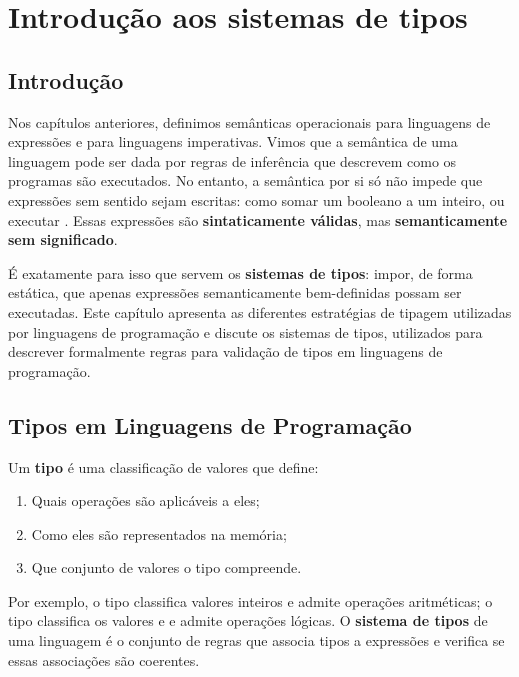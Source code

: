 \chapter{Introdução aos sistemas de tipos}

\section{Introdução}

Nos capítulos anteriores, definimos semânticas operacionais para
linguagens de expressões e para linguagens imperativas. Vimos que a
semântica de uma linguagem pode ser dada por regras de inferência que
descrevem como os programas são executados. No entanto, a semântica
por si só não impede que expressões sem sentido sejam escritas: como
somar um booleano a um inteiro, ou executar
. Essas expressões são
\textbf{sintaticamente válidas}, mas \textbf{semanticamente sem significado}.

É exatamente para isso que servem os \textbf{sistemas de tipos}:
impor, de forma estática, que apenas expressões semanticamente
bem-definidas possam ser executadas. Este capítulo apresenta as
diferentes estratégias de tipagem utilizadas por linguagens de
programação e discute os sistemas de tipos, utilizados para descrever
formalmente regras para validação de tipos em linguagens de programação.

\section{Tipos em Linguagens de Programação}

Um \textbf{tipo} é uma classificação de valores que define:

\begin{enumerate}
  \item Quais operações são aplicáveis a eles;
  \item Como eles são representados na memória;
  \item Que conjunto de valores o tipo compreende.
\end{enumerate}

Por exemplo, o tipo  classifica valores
inteiros e admite operações aritméticas; o tipo
 classifica os valores
 e  e
admite operações lógicas. O \textbf{sistema de tipos} de uma
linguagem é o conjunto de regras que associa tipos a expressões e
verifica se essas associações são coerentes.

